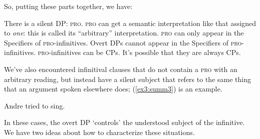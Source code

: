So, putting these parts together, we have:%
\begin{exe}
\ex \label{ex3:summlist1} 
\begin{xlist}
	\ex There is a silent DP: \textsc{pro}.
	\ex \textsc{pro} can get a semantic interpretation like that assigned to \emph{one}: this is called its ``arbitrary'' interpretation.
	\ex \textsc{pro} can only appear in the Specifiers of \textsc{pro}-infinitives.
	\ex Overt DPs cannot appear in the Specifiers of \textsc{pro}-infinitives.
	\ex \textsc{pro}-infinitives can be CPs. It's possible that they are always CPs.
\end{xlist}
\end{exe}

We've also encountered infinitival clauses that do not contain a \textsc{pro} with an arbitrary reading, but instead have a silent subject that refers to the same thing that an argument spoken elsewhere does; (\ref{ex3:summ3}) is an example.
\begin{exe}
\ex \label{ex3:summ3} Andre tried to sing.
\end{exe}
In these cases, the overt DP `controls' the understood subject of the infinitive. We have two ideas about how to characterize these situations.

